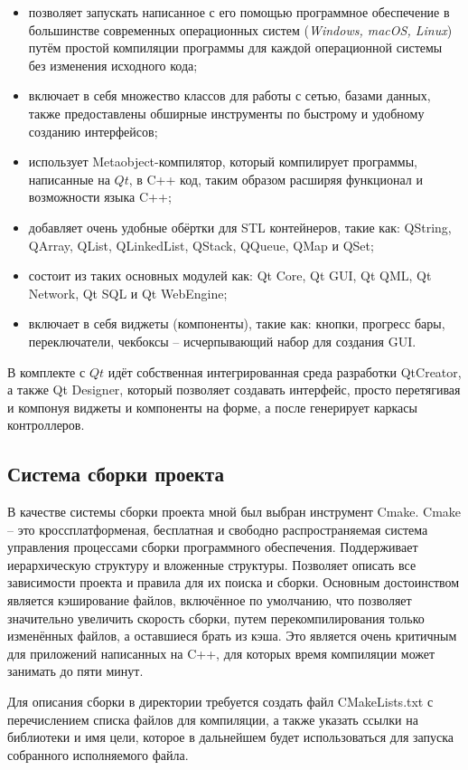 \begin{itemize}
    \item позволяет запускать написанное с его помощью программное обеспечение в большинстве современных операционных систем (\textit{Windows, macOS, Linux}) путём простой компиляции программы для каждой операционной системы без изменения исходного кода;
    \item включает в себя множество классов для работы с сетью, базами данных, также предоставлены обширные инструменты по быстрому и удобному созданию интерфейсов;
    \item использует Metaobject-компилятор, который компилирует программы, написанные на $Qt$, в C++ код, таким образом расширяя функционал и возможности языка C++;
    \item добавляет очень удобные обёртки для STL контейнеров, такие как: QString, QArray, QList, QLinkedList, QStack, QQueue, QMap и QSet;
    \item состоит из таких основных модулей как: Qt Core, Qt GUI, Qt QML, Qt Network, Qt SQL и Qt WebEngine;
    \item включает в себя виджеты (компоненты), такие как: кнопки, прогресс бары, переключатели, чекбоксы -- исчерпывающий набор для создания GUI.
\end{itemize}

В комплекте с $Qt$ идёт собственная интегрированная среда разработки QtCreator, а также Qt Designer, который позволяет создавать интерфейс, просто перетягивая и компонуя виджеты и компоненты на форме, а после генерирует каркасы контроллеров.

\subsection{Система сборки проекта}
В качестве системы сборки проекта мной был выбран инструмент Cmake. Cmake -- это кроссплатформеная, бесплатная и свободно распространяемая система управления процессами сборки программного обеспечения. Поддерживает иерархическую структуру и вложенные структуры. Позволяет описать все зависимости проекта и правила для их поиска и сборки. Основным достоинством является кэширование файлов, включённое по умолчанию, что позволяет значительно увеличить скорость сборки, путем перекомпилирования только изменённых файлов, а оставшиеся брать из кэша. Это является очень критичным для приложений написанных на C++, для которых время компиляции может занимать до пяти минут.

Для описания сборки в директории требуется создать файл CMakeLists.txt с перечислением списка файлов для компиляции, а также указать ссылки на библиотеки и имя цели, которое в дальнейшем будет использоваться для запуска собранного исполняемого файла.

